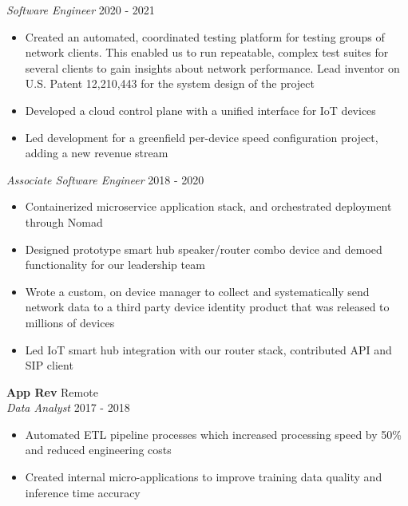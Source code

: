 \documentclass[a4paper]{article}
\begin{document}
\textit{Software Engineer} \hfill 2020 - 2021\\
\vspace{-1mm}
\begin{itemize} \itemsep 1pt
  \item Created an automated, coordinated testing platform for testing groups of network clients. 
    This enabled us to run repeatable, complex test suites for several clients 
    to gain insights about network performance. Lead inventor on U.S. Patent 12,210,443 for the system design of the project
  \item Developed a cloud control plane with a unified interface for IoT devices
  \item Led development for a greenfield per-device speed configuration project,
    adding a new revenue stream

\end{itemize}

\textit{Associate Software Engineer} \hfill 2018 - 2020\\
\vspace{-1mm}
\begin{itemize} \itemsep 1pt
	\item Containerized microservice application stack, and orchestrated deployment through Nomad
	\item Designed prototype smart hub speaker/router combo device and demoed functionality for our leadership team
	\item Wrote a custom, on device manager to collect and systematically send network data to a third party device identity product that was released to millions of devices
	\item Led IoT smart hub integration with our router stack, contributed API and SIP client
\end{itemize}

\textbf{App Rev} \hfill Remote\\
\textit{Data Analyst} \hfill 2017 - 2018\\
\vspace{-1mm}
\begin{itemize} \itemsep 1pt
	\item Automated ETL pipeline processes which increased processing speed by 50\% and reduced engineering costs
	\item Created internal micro-applications to improve training data quality and inference time accuracy
\end{itemize}
\end{document}
